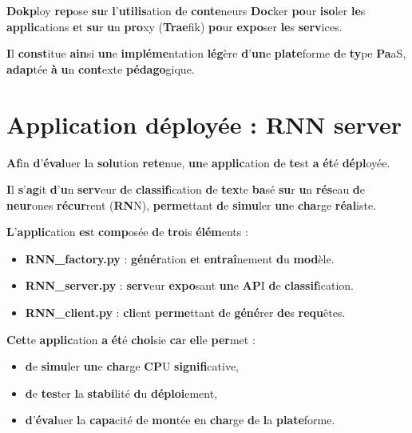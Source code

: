 \documentclass{rapportClass} %
\begin{document}
\textbf{Dokp}loy \textbf{rep}ose \textbf{su}r \textbf{l}’\textbf{utilis}ation \textbf{d}e \textbf{conte}neurs \textbf{Doc}ker \textbf{po}ur \textbf{iso}ler \textbf{le}s
\textbf{applic}ations \textbf{e}t \textbf{su}r \textbf{u}n \textbf{pro}xy (\textbf{Trae}fik) \textbf{po}ur \textbf{expo}ser \textbf{le}s \textbf{serv}ices.

\textbf{I}l \textbf{const}itue \textbf{ain}si \textbf{un}e \textbf{impléme}ntation \textbf{lég}ère \textbf{d}’\textbf{un}e \textbf{plate}forme \textbf{d}e \textbf{ty}pe
\textbf{Pa}aS, \textbf{adap}tée \textbf{à} \textbf{u}n \textbf{cont}exte \textbf{pédago}gique.

\section{Application déployée : RNN server}

\textbf{Af}in \textbf{d}’\textbf{éval}uer \textbf{l}a \textbf{solu}tion \textbf{rete}nue, \textbf{un}e \textbf{applic}ation \textbf{d}e \textbf{te}st \textbf{a} \textbf{ét}é
\textbf{dépl}oyée.

\textbf{I}l \textbf{s}’\textbf{ag}it \textbf{d}’\textbf{u}n \textbf{serv}eur \textbf{d}e \textbf{classif}ication \textbf{d}e \textbf{tex}te \textbf{ba}sé \textbf{su}r \textbf{u}n \textbf{rés}eau
\textbf{d}e \textbf{neur}ones \textbf{récur}rent (\textbf{RN}N), \textbf{perme}ttant \textbf{d}e \textbf{simu}ler \textbf{un}e \textbf{cha}rge \textbf{réal}iste.

\textbf{L}’\textbf{applic}ation \textbf{es}t \textbf{comp}osée \textbf{d}e \textbf{tro}is \textbf{élém}ents :

\begin{itemize}
\item \textbf{\textbf{RN}N_factory.\textbf{p}y} : \textbf{génér}ation \textbf{e}t \textbf{entraî}nement \textbf{d}u \textbf{mod}èle.
\item \textbf{\textbf{RN}N_server.\textbf{p}y} : \textbf{serv}eur \textbf{expo}sant \textbf{un}e \textbf{AP}I \textbf{d}e \textbf{classif}ication.
\item \textbf{\textbf{RN}N_client.\textbf{p}y} : \textbf{cli}ent \textbf{perme}ttant \textbf{d}e \textbf{géné}rer \textbf{de}s \textbf{requ}êtes.
\end{itemize}
\vspace{0.5cm}

\textbf{Cet}te \textbf{applic}ation \textbf{a} \textbf{ét}é \textbf{choi}sie \textbf{ca}r \textbf{el}le \textbf{per}met :
\begin{itemize}
\item \textbf{d}e \textbf{simu}ler \textbf{un}e \textbf{cha}rge \textbf{CP}U \textbf{signifi}cative,
\item \textbf{d}e \textbf{tes}ter \textbf{l}a \textbf{stabi}lité \textbf{d}u \textbf{déploi}ement,
\item \textbf{d}’\textbf{éval}uer \textbf{l}a \textbf{capa}cité \textbf{d}e \textbf{mon}tée \textbf{e}n \textbf{cha}rge \textbf{d}e \textbf{l}a \textbf{plate}forme.
\end{itemize}
\end{document}
